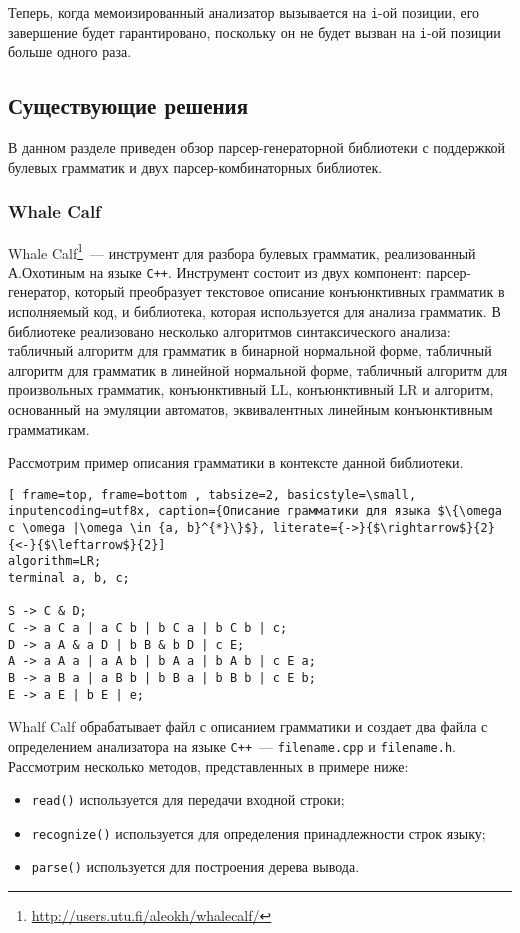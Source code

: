 Теперь, когда мемоизированный анализатор вызывается на {\tt i}-ой позиции, его завершение будет гарантировано, поскольку он не будет вызван на {\tt i}-ой позиции больше одного раза.
    
\subsection{Существующие решения}
В данном разделе приведен обзор парсер-генераторной библиотеки с поддержкой булевых грамматик и двух парсер-комбинаторных библиотек.
\subsubsection{Whale Calf}

Whale Calf\footnote{\url{http://users.utu.fi/aleokh/whalecalf/}}~--- инструмент для разбора булевых грамматик, реализованный А.Охотиным на языке {\tt C++}. Инструмент состоит из двух компонент: парсер-генератор, который преобразует текстовое описание конъюнктивных грамматик в исполняемый код, и библиотека, которая используется для анализа грамматик. В библиотеке реализовано несколько алгоритмов синтаксического анализа: табличный алгоритм для грамматик в бинарной нормальной форме, табличный алгоритм для грамматик в линейной нормальной форме, табличный алгоритм для произвольных грамматик, конъюнктивный LL, конъюнктивный LR и алгоритм, основанный на эмуляции автоматов, эквивалентных линейным конъюнктивным грамматикам. 

Рассмотрим пример описания грамматики в контексте данной библиотеки.
\begin{lstlisting}[ frame=top, frame=bottom , tabsize=2, basicstyle=\small, inputencoding=utf8x, caption={Описание грамматики для языка $\{\omega c \omega |\omega \in {a, b}^{*}\}$}, literate={->}{$\rightarrow$}{2} {<-}{$\leftarrow$}{2}]
algorithm=LR;
terminal a, b, c;

S -> C & D;
C -> a C a | a C b | b C a | b C b | c;
D -> a A & a D | b B & b D | c E;
A -> a A a | a A b | b A a | b A b | c E a;
B -> a B a | a B b | b B a | b B b | c E b;
E -> a E | b E | e;
\end{lstlisting}

Whalf Calf обрабатывает файл с описанием грамматики и создает два файла с определением анализатора на языке {\tt C++}~--- {\tt filename.cpp} и {\tt filename.h}. Рассмотрим несколько методов, представленных в примере ниже:
\begin{itemize}
    \item {\tt read()} используется для передачи входной строки;
    \item {\tt recognize()} используется для определения принадлежности строк языку;
    \item {\tt parse()} используется для построения дерева вывода.
     
\end{itemize}

